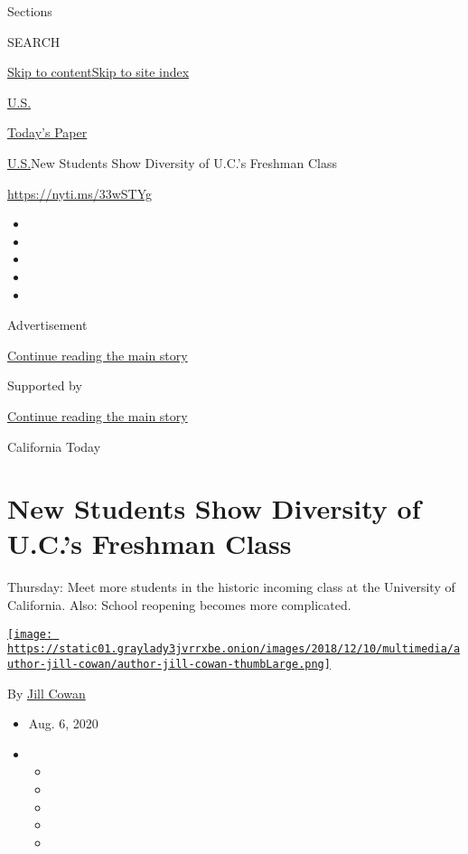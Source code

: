 Sections

SEARCH

\protect\hyperlink{site-content}{Skip to
content}\protect\hyperlink{site-index}{Skip to site index}

\href{https://www.nytimes3xbfgragh.onion/section/us}{U.S.}

\href{https://myaccount.nytimes3xbfgragh.onion/auth/login?response_type=cookie\&client_id=vi}{}

\href{https://www.nytimes3xbfgragh.onion/section/todayspaper}{Today's
Paper}

\href{/section/us}{U.S.}\textbar{}New Students Show Diversity of U.C.'s
Freshman Class

\url{https://nyti.ms/33wSTYg}

\begin{itemize}
\item
\item
\item
\item
\item
\end{itemize}

Advertisement

\protect\hyperlink{after-top}{Continue reading the main story}

Supported by

\protect\hyperlink{after-sponsor}{Continue reading the main story}

California Today

\hypertarget{new-students-show-diversity-of-ucs-freshman-class}{%
\section{New Students Show Diversity of U.C.'s Freshman
Class}\label{new-students-show-diversity-of-ucs-freshman-class}}

Thursday: Meet more students in the historic incoming class at the
University of California. Also: School reopening becomes more
complicated.

\href{https://www.nytimes3xbfgragh.onion/by/jill-cowan}{\texttt{[image: https://static01.graylady3jvrrxbe.onion/images/2018/12/10/multimedia/author-jill-cowan/author-jill-cowan-thumbLarge.png]}}

By \href{https://www.nytimes3xbfgragh.onion/by/jill-cowan}{Jill Cowan}

\begin{itemize}
\item
  Aug. 6, 2020
\item
  \begin{itemize}
  \item
  \item
  \item
  \item
  \item
  \end{itemize}
\end{itemize}

